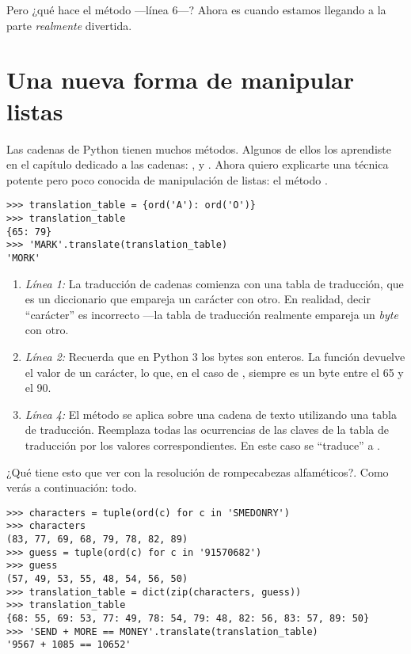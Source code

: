 Pero ¿qué hace el método  ---línea 6---? Ahora es cuando estamos llegando a la parte \emph{realmente} divertida.

\section{Una nueva forma de manipular listas}

Las cadenas de Python tienen muchos métodos. Algunos de ellos los aprendiste en el capítulo dedicado a las cadenas: ,  y . Ahora quiero explicarte una técnica potente pero poco conocida de manipulación de listas: el método .

\noindent\begin{minipage}{\textwidth}
\begin{lstlisting}[mathescape=True]
>>> translation_table = {ord('A'): ord('O')}
>>> translation_table                      
{65: 79}
>>> 'MARK'.translate(translation_table)   
'MORK'
\end{lstlisting}
\end{minipage}

\begin{enumerate}

\item \emph{Línea 1:} La traducción de cadenas comienza con una tabla de traducción, que es un diccionario que empareja un carácter con otro. En realidad, decir ``carácter'' es incorrecto ---la tabla de traducción realmente empareja un \emph{byte} con otro.

\item \emph{Línea 2:} Recuerda que en Python 3 los bytes son enteros. La función  devuelve el valor  de un carácter, lo que, en el caso de , siempre es un byte entre el 65 y el 90.

\item \emph{Línea 4:} El método  se aplica sobre una cadena de texto utilizando una tabla de traducción. Reemplaza todas las ocurrencias de las claves de la tabla de traducción por los valores correspondientes. En este caso se ``traduce''  a .

\end{enumerate}

¿Qué tiene esto que ver con la resolución de rompecabezas alfaméticos?. Como verás a continuación: todo.

\noindent\begin{minipage}{\textwidth}
\begin{lstlisting}[mathescape=True]
>>> characters = tuple(ord(c) for c in 'SMEDONRY')
>>> characters
(83, 77, 69, 68, 79, 78, 82, 89)
>>> guess = tuple(ord(c) for c in '91570682')
>>> guess
(57, 49, 53, 55, 48, 54, 56, 50)
>>> translation_table = dict(zip(characters, guess))
>>> translation_table
{68: 55, 69: 53, 77: 49, 78: 54, 79: 48, 82: 56, 83: 57, 89: 50}
>>> 'SEND + MORE == MONEY'.translate(translation_table)
'9567 + 1085 == 10652'
\end{lstlisting}
\end{minipage}

